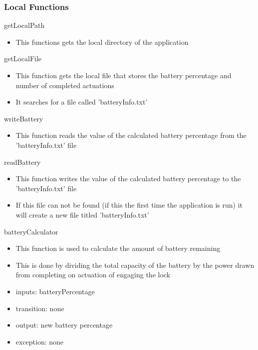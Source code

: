 \documentclass[12pt, titlepage]{article}
\begin{document}
\subsubsection{Local Functions}

\noindent getLocalPath
\begin{itemize}
\item This functions gets the local directory of the application
\end{itemize}

\noindent getLocalFile
\begin{itemize}
\item This function gets the local file that stores the battery percentage and number of completed actuations 
\item It searches for a file called 'batteryInfo.txt'
\end{itemize}

\noindent writeBattery
\begin{itemize}
\item This function reads the value of the calculated battery percentage from the 'batteryInfo.txt' file
\end{itemize}

\noindent readBattery
\begin{itemize}
\item This function writes the value of the calculated battery percentage to the 'batteryInfo.txt' file
\item If this file can not be found (if this the first time the application is run) it will create a new file titled 'batteryInfo.txt'
\end{itemize}

\noindent batteryCalculator
\begin{itemize}
\item This function is used to calculate the amount of battery remaining
\item This is done by dividing the total capacity of the battery by the power drawn from completing on actuation of engaging the lock
\end{itemize}

\begin{itemize}
\item inputs: batteryPercentage
\item transition: none
\item output: new battery percentage
\item exception: none
\end{itemize}
\end{document}
